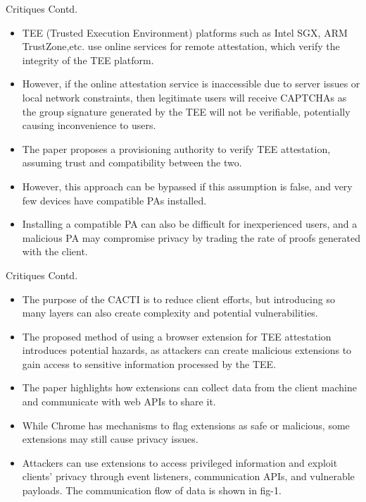 \documentclass{beamer}
\begin{document}
\begin{frame}{Critiques Contd.}
	\begin{itemize}
		\item TEE (Trusted Execution Environment) platforms such as Intel SGX, ARM TrustZone,etc. use online services for remote attestation, which verify the integrity of the TEE platform.
		\item However, if the online attestation service is inaccessible due to server issues or local network constraints, then legitimate users will receive CAPTCHAs as the group signature generated by the TEE will not be verifiable, potentially causing inconvenience to users.
		\item The paper proposes a provisioning authority to verify TEE attestation, assuming trust and compatibility between the two.
		\item However, this approach can be bypassed if this assumption is false, and very few devices have compatible PAs installed.
		\item Installing a compatible PA can also be difficult for inexperienced users, and a malicious PA may compromise privacy by trading the rate of proofs generated with the client.
	\end{itemize}
\end{frame}

\begin{frame}{Critiques Contd.}
	\begin{itemize}
		\item The purpose of the CACTI is to reduce client efforts, but introducing so many layers can also create complexity and potential vulnerabilities.
		\item The proposed method of using a browser extension for TEE attestation introduces potential hazards, as attackers can create malicious extensions to gain access to sensitive information processed by the TEE.
		\item The paper highlights how extensions can collect data from the client machine and communicate with web APIs to share it.
		\item While Chrome has mechanisms to flag extensions as safe or malicious, some extensions may still cause privacy issues.
		\item Attackers can use extensions to access privileged information and exploit clients' privacy through event listeners, communication APIs, and vulnerable payloads. The communication flow of data is shown in fig-1.
	\end{itemize}
\end{frame}
\end{document}
